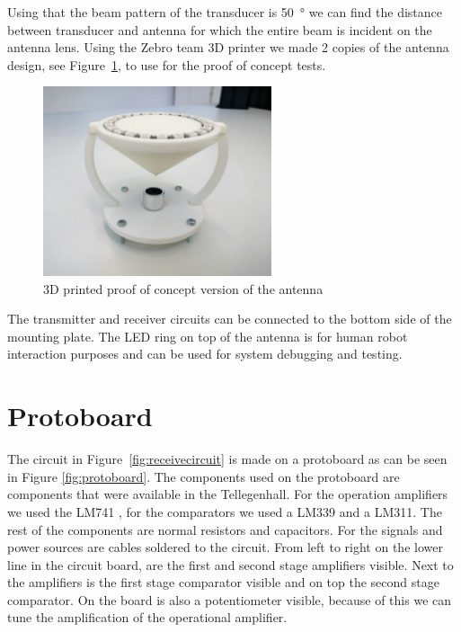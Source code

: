 Using that the beam pattern of the transducer is \SI{50}{\degree} we can find the distance between transducer and antenna for which the entire beam is incident on the antenna lens. Using the Zebro team 3D printer we made 2 copies of the antenna design, see Figure~\ref{fig:3D_ant}, to use for the proof of concept tests.

\begin{figure}[H]
\centering
\includegraphics[width=0.6\textwidth]{Figures/3D_ant.jpeg}
\caption{3D printed proof of concept version of the antenna}\label{fig:3D_ant}
\end{figure}

The transmitter and receiver circuits can be connected to the bottom side of the mounting plate. The LED ring on top of the antenna is for human robot interaction purposes and can be used for system debugging and testing.


\section{Protoboard}

The circuit in Figure~\ref{fig:receivecircuit} is made on a protoboard as can be seen in Figure \ref{fig:protoboard}. The components used on the protoboard are components that were available in the Tellegenhall. For the operation amplifiers we used the LM741 \cite{LM741}, for the comparators we used a LM339 and a LM311. The rest of the components are normal resistors and capacitors. For the signals and power sources are cables soldered to the circuit. From left to right on the lower line in the circuit board, are the first and second stage amplifiers visible. Next to the amplifiers is the first stage comparator visible and on top the second stage comparator. On the board is also a potentiometer visible, because of this we can tune the amplification of the operational amplifier.


